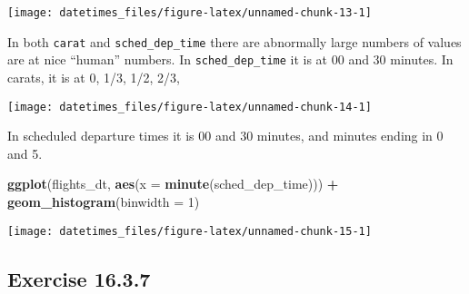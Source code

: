\documentclass[]{book}
\newenvironment{Shaded}{\begin{snugshade}}{\end{snugshade}}
\newcommand{\DataTypeTok}[1]{\textcolor[rgb]{0.13,0.29,0.53}{#1}}
\newcommand{\DecValTok}[1]{\textcolor[rgb]{0.00,0.00,0.81}{#1}}
\newcommand{\KeywordTok}[1]{\textcolor[rgb]{0.13,0.29,0.53}{\textbf{#1}}}
\newcommand{\NormalTok}[1]{#1}
\newcommand{\OperatorTok}[1]{\textcolor[rgb]{0.81,0.36,0.00}{\textbf{#1}}}
\newcommand{\StringTok}[1]{\textcolor[rgb]{0.31,0.60,0.02}{#1}}
\theoremstyle{plain}
\theoremstyle{remark}
\theoremstyle{definition}
\theoremstyle{definition}
\theoremstyle{definition}
\theoremstyle{remark}
\begin{document}
\begin{center}\texttt{[image: datetimes\_files/figure-latex/unnamed-chunk-13-1]} \end{center}

In both \texttt{carat} and \texttt{sched\_dep\_time} there are
abnormally large numbers of values are at nice ``human'' numbers. In
\texttt{sched\_dep\_time} it is at 00 and 30 minutes. In carats, it is
at 0, 1/3, 1/2, 2/3,

\begin{Shaded}
\end{Shaded}

\begin{center}\texttt{[image: datetimes\_files/figure-latex/unnamed-chunk-14-1]} \end{center}

In scheduled departure times it is 00 and 30 minutes, and minutes ending
in 0 and 5.

\begin{Shaded}
\begin{Highlighting}[]
\KeywordTok{ggplot}\NormalTok{(flights_dt, }\KeywordTok{aes}\NormalTok{(}\DataTypeTok{x =} \KeywordTok{minute}\NormalTok{(sched_dep_time))) }\OperatorTok{+}
\StringTok{  }\KeywordTok{geom_histogram}\NormalTok{(}\DataTypeTok{binwidth =} \DecValTok{1}\NormalTok{)}
\end{Highlighting}
\end{Shaded}

\begin{center}\texttt{[image: datetimes\_files/figure-latex/unnamed-chunk-15-1]} \end{center}

\hypertarget{exercise-16.3.7}{%
\subsection*{\texorpdfstring{Exercise
{16.3.7}}{Exercise 16.3.7}}\label{exercise-16.3.7}}
\end{document}

